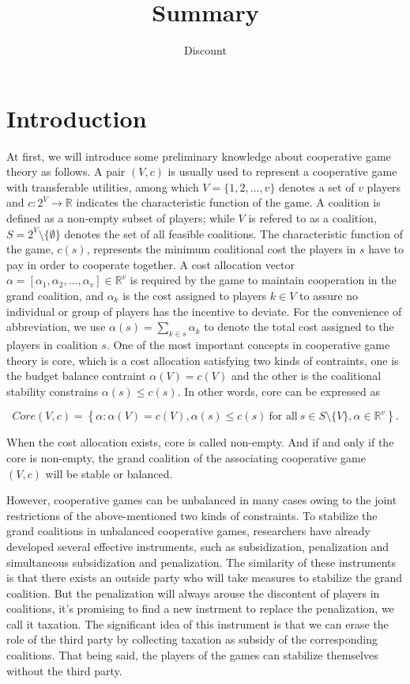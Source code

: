 \documentclass[UTF8]{article}
\title{Summary}
\author{Dis\cdot count}
\begin{document}
\maketitle{}

\section*{Introduction}
At first, we will introduce some preliminary knowledge about cooperative game theory as follows.
A pair $(V,c)$ is usually used to represent a cooperative game with transferable utilities, among which $V=\{1,2,\dots,v\}$ denotes a set of $v$ players and $c:2^{V}\to \mathbb{R}$ indicates the characteristic function of the game. A coalition is defined as a non-empty subset of players; while $V$ is refered to as a coalition, $S=2^{V} \setminus\{\emptyset\}$ denotes the set of all feasible coalitions. The characteristic function of the game, $c(s)$, represents the minimum coalitional cost the players in $s$ have to pay in order to cooperate together.
A cost allocation vector $\alpha=[\alpha_{1},\alpha_{2},\dots,\alpha_{v}] \in \mathbb{R}^{v}$ is required by the game to maintain cooperation in the grand coalition, and $\alpha_{k}$ is the cost assigned to players $k \in V$ to assure no individual or group of players has the incentive to deviate. For the convenience of abbreviation, we use $\alpha(s)=\sum_{k\in{s}}\alpha_{k}$ to denote the total cost assigned to the players in coalition $s$.
One of the most important concepts in cooperative game theory is core, which is a cost allocation satisfying two kinds of contraints, one is the budget balance contraint {$\alpha(V)=c(V)$} and the other is the coalitional stability constrains {$\alpha(s) \leq c(s)$}. In other words, core can be expressed as

\[
Core(V,c)= \left\{\alpha:\alpha(V)=c(V), \alpha(s)\leq c(s)\ \text{for all}\ s \in S \setminus\{V\}, \alpha \in \mathbb{R}^{v} \right\}.
\]

When the cost allocation exists, core is called non-empty. And if and only if the core is non-empty, the grand coalition of the associating cooperative game $(V,c)$ will be stable or balanced.

However, cooperative games can be unbalanced in many cases owing to the joint restrictions of the above-mentioned two kinds of constraints. To stabilize the grand coalitions in unbalanced cooperative games, researchers have already developed several effective instruments, such as subsidization, penalization and simultaneous subsidization and penalization. The
similarity of these instruments is that there exists an outside party who will take measures to stabilize the grand coalition. But the penalization will always arouse the discontent of players in coalitions, it's promising to find a new instrment to replace the penalization, we call it taxation.
The significant idea of this instrument is that we can erase the role of the third party by collecting taxation as subsidy of the corresponding coalitions.
That being said, the players of the games can stabilize themselves without the third party.
\end{document}
